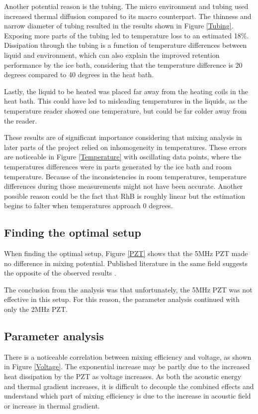 \documentclass[twoside,twocolumn,9pt,a4paper]{IEEEtran}
\begin{document}
Another potential reason is the tubing. The micro environment and tubing used increased thermal diffusion compared to its macro counterpart. The thinness and narrow diameter of tubing resulted in the results shown in Figure \ref{Tubing}. Exposing more parts of the tubing led to temperature loss to an estimated 18\%. Dissipation through the tubing is a function of temperature differences between liquid and environment, which can also explain the improved retention performance by the ice bath, considering that the temperature difference is 20 degrees compared to 40 degrees in the heat bath.

Lastly, the liquid to be heated was placed far away from the heating coils in the heat bath. This could have led to misleading temperatures in the liquids, as the temperature reader showed one temperature, but could be far colder away from the reader.

These results are of significant importance considering that mixing analysis in later parts of the project relied on inhomogeneity in temperatures. These errors are noticeable in Figure \ref{Temperature} with oscillating data points, where the temperatures differences were in parts generated by the ice bath and room temperature. Because of the inconsistencies in room temperatures, temperature differences during those measurements might not have been accurate. Another possible reason could be the fact that RhB is roughly linear but the estimation begins to falter when temperatures approach 0 degrees\cite{Natrajan}.

\subsection{Finding the optimal setup}

When finding the optimal setup, Figure \ref{PZT} shows that the 5MHz PZT made no difference in mixing potential. Published literature in the same field suggests the opposite of the observed results \cite{Corato}. 

The conclusion from the analysis was that unfortunately, the 5MHz PZT was not effective in this setup. For this reason, the parameter analysis continued with only the 2MHz PZT.

\subsection{Parameter analysis}

There is a noticeable correlation between mixing efficiency and voltage, as shown in Figure \ref{Voltage}. The exponential increase may be partly due to the increased heat dissipation by the PZT as voltage increases. As both the acoustic energy and thermal gradient increases, it is difficult to decouple the combined effects and understand which part of mixing efficiency is due to the increase in acoustic field or increase in thermal gradient.
\end{document}
